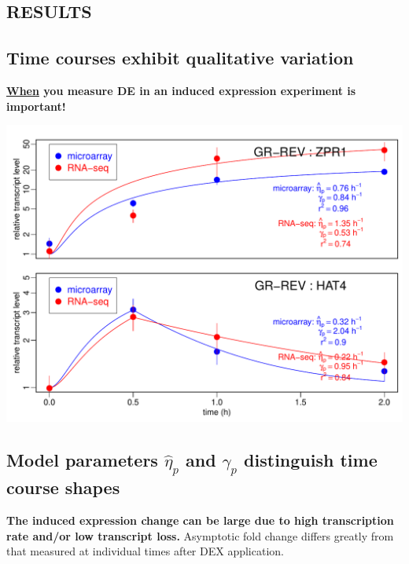 \documentclass[aspb,landscape]{a0poster}
\newlength{\figwidth}
\begin{document}
\begin{multicols}{4}
  \section*{RESULTS}

  
  \subsection*{Time courses exhibit qualitative variation}

  \textbf{\underline{When} you measure DE in an induced expression experiment is important!}
  
  \begin{minipage}[t]{1.0\linewidth}
    \includegraphics[width=\figwidth]{ZPR1-HAT4}
  \end{minipage}

  \subsection*{Model parameters $\hat{\eta}_p$ and $\gamma_p$ distinguish time course shapes}

  \textbf{The induced expression change can be large due to high transcription rate and/or low transcript loss.}
  Asymptotic fold change differs greatly from that measured at individual times after DEX application.
  

\end{multicols}
\end{document}
